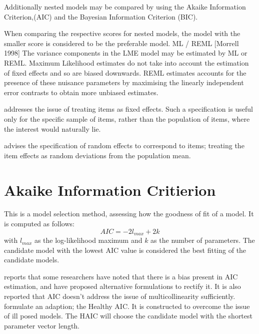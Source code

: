 \documentclass[12pt, a4paper]{report}
\theoremstyle{plain}
\theoremstyle{definition}
\theoremstyle{remark}
\begin{document}
Additionally nested models may be compared by using the Akaike Information Criterion,(AIC) and the Bayesian Information Criterion (BIC).

When comparing the respective scores for nested models, the model with the smaller score is considered to be the preferable model.
ML / REML
[Morrell 1998]
The variance components in the LME model may be estimated by ML or REML.
Maximum Likelihood estimates do not take into account the estimation of fixed effects and so
are biased downwards.
REML estimates accounts for the presence of these nuisance parameters by maximising the linearly independent error contrasts to obtain more unbiased estimates.

\citet{PB} addresses the issue of treating items as fixed effects. Such a specification is useful only for the specific sample of items, rather than the population of items, where the interest would naturally lie.

\citet{PB} advises the specification of random effects to correspond to items; treating the item effects as random deviations from the population mean.



%
%

\section{Akaike Information Critierion}
This is a model selection method, assessing how the goodness of
fit of a model. It is computed as follows:
\begin{displaymath}
AIC = -2l_{max}+ 2k
\end{displaymath}
with $l_{max}$ as the log-likelihood maximum and $k$ as the number
of parameters. The candidate model with the lowest AIC value is
considered the best fitting of the candidate models.

\citet[p.13]{Demi} reports that some researchers have noted that
there is a bias present in AIC estimation, and have proposed
alternative formulations to rectify it. It is also reported that
AIC doesn't address the issue of multicollinearity sufficiently.
\citet{Demi} formulate an adaption; the Healthy AIC. It is
constructed to overcome the issue of ill posed models. The HAIC
will choose the candidate model with the shortest parameter vector
length.
\end{document}
